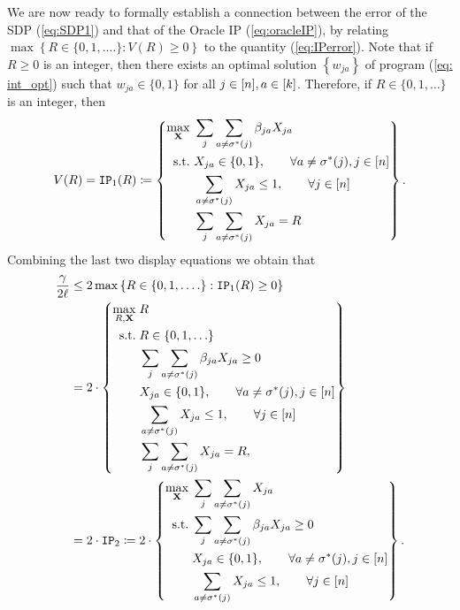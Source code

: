 We are now ready to formally establish a connection between the error
of the SDP (\ref{eq:SDP1}) and that of the Oracle IP (\ref{eq:oracleIP}),
by relating $\max\left\{ R\in\{0,1,.\ldots\}:V(R)\ge0\right\} $ to
the quantity (\ref{eq:IPerror}). Note that if $R\ge0$ is an integer,
then there exists an optimal solution $\left\{ w_{ja}\right\} $ of
program (\ref{eq: int_opt}) such that $w_{ja}\in\{0,1\}$ for all
$j\in[n],a\in[k]$. Therefore, if $R\in\{0,1,\ldots\}$
is an integer, then 
\begin{equation}
V(R)=\textup{\texttt{IP}}_{1}(R)\coloneqq\left\{ \begin{aligned}\max_{\mathbf{X}}\  & \sum_{j}\sum_{a\ne\sigma^{*}(j)}\beta_{ja}X_{ja}\\
\text{s.t.}\  & X_{ja}\in\{0,1\},\qquad\forall a\ne\sigma^{*}(j),j\in\left[n\right]\\
 & \sum_{a\ne\sigma^{*}(j)}X_{ja}\leq1,\qquad\forall j\in\left[n\right]\\
 & \sum_{j}\sum_{a\ne\sigma^{*}(j)}X_{ja}=R
\end{aligned}
\right\} .\label{eq:IP1}
\end{equation}
Combining the last two display equations we obtain that
\begin{align}
\frac{\gamma}{2\ell} & \le2\max\left\{ R\in\{0,1,.\ldots\}:\textup{\texttt{IP}}_{1}(R)\ge0\right\} \nonumber \\
 & \overset{}{=}2\cdot\left\{ \begin{aligned}\max_{R,\mathbf{X}}\; & R\\
\text{s.t.}\; & R\in\{0,1,\ldots\}\\
 & \sum_{j}\sum_{a\ne\sigma^{*}(j)}\beta_{ja}X_{ja}\ge0\\
 & X_{ja}\in\{0,1\},\qquad\forall a\ne\sigma^{*}(j),j\in\left[n\right]\\
 & \sum_{a\ne\sigma^{*}(j)}X_{ja}\leq1,\qquad\forall j\in\left[n\right]\\
 & \sum_{j}\sum_{a\ne\sigma^{*}(j)}X_{ja}=R,
\end{aligned}
\right\} \nonumber \\
 & =2\cdot\textup{\texttt{IP}}_{2}\coloneqq2\cdot\left\{ \begin{aligned}\max_{\mathbf{X}}\; & \sum_{j}\sum_{a\ne\sigma^{*}(j)}X_{ja}\\
\text{s.t.}\; & \sum_{j}\sum_{a\ne\sigma^{*}(j)}\beta_{ja}X_{ja}\ge0\\
 & X_{ja}\in\{0,1\},\qquad\forall a\ne\sigma^{*}(j),j\in\left[n\right]\\
 & \sum_{a\ne\sigma^{*}(j)}X_{ja}\leq1,\qquad\forall j\in\left[n\right]
\end{aligned}
\right\} .\label{eq:error_bound2}
\end{align}

